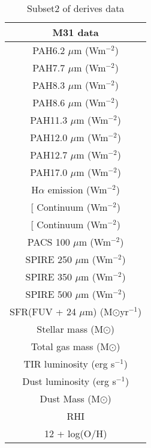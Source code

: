 \begin{table}
\centering
\caption{Subset2 of derives data}
\label{tab: subset2}
\begin{tabular}{ |c| }
\hline
M31 data  \\
\hline\hline
PAH6.2 $\mu$m (Wm$^{-2}$)  \\
PAH7.7 $\mu$m (Wm$^{-2}$)  \\
PAH8.3 $\mu$m (Wm$^{-2}$)  \\
PAH8.6 $\mu$m (Wm$^{-2}$)  \\
PAH11.3 $\mu$m (Wm$^{-2}$)  \\
PAH12.0 $\mu$m (Wm$^{-2}$) \\
PAH12.7 $\mu$m (Wm$^{-2}$)  \\
PAH17.0 $\mu$m (Wm$^{-2}$)  \\
H$\alpha$ emission (Wm$^{-2}$) \\
{[}\sii{]} Continuum (Wm$^{-2}$)  \\
{[}\oiii{]} Continuum (Wm$^{-2}$)  \\
PACS 100 $\mu$m (Wm$^{-2}$)\\
SPIRE 250 $\mu$m (Wm$^{-2}$)\\
SPIRE 350 $\mu$m (Wm$^{-2}$)\\
SPIRE 500 $\mu$m (Wm$^{-2}$)\\
SFR(FUV + 24 $\mu$m) (M$\odot$yr$^{-1}$) \\
Stellar mass (M$\odot$)\\
Total gas mass (M$\odot$)  \\
TIR luminosity (erg s$^{-1}$)  \\
Dust luminosity (erg s$^{-1}$)  \\
Dust Mass (M$\odot$)\\
RHI \\
12 + log(O/H)\\
\hline
\end{tabular}
\end{table}
